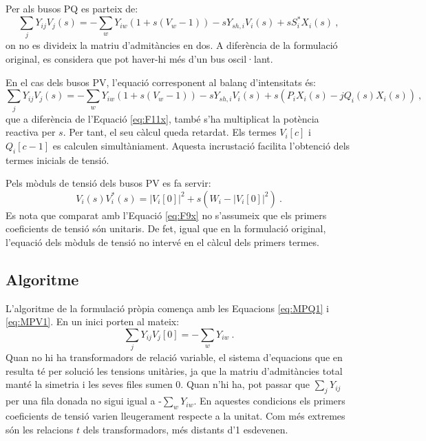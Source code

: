 Per als busos PQ es parteix de:
\begin{equation}
    \sum_{j}Y_{ij}V_j(s) = -\sum_wY_{iw}(1+s(V_w-1)) -sY_{sh,i}V_i(s)+sS^*_iX_i(s)\ ,
        \label{eq:MPQ1}
\end{equation} 
on no es divideix la matriu d'admitàncies en dos. A diferència de la formulació original, es considera que pot haver-hi més d'un bus oscil·lant. 

En el cas dels busos PV, l'equació corresponent al balanç d'intensitats és:
\begin{equation}
    \sum_{j}Y_{ij}V_j(s) = -\sum_wY_{iw}(1+s(V_w-1)) -sY_{sh,i}V_i(s)+s(P_iX_i(s)-jQ_i(s)X_i(s))\ ,
        \label{eq:MPV1}
\end{equation}
que a diferència de l'Equació \ref{eq:F11x}, també s'ha multiplicat la potència reactiva per $s$. Per tant, el seu càlcul queda retardat. Els termes $V_i[c]$ i $Q_i[c-1]$ es calculen simultàniament. Aquesta incrustació facilita l'obtenció dels termes inicials de tensió. 

Pels mòduls de tensió dels busos PV es fa servir:
\begin{equation}
    V_i(s)V^*_i(s)=|V_i[0]|^2+s(W_i-|V_i[0]|^2)\ .
        \label{eq:MPV2}
\end{equation}
Es nota que comparat amb l'Equació \ref{eq:F9x} no s'assumeix que els primers coeficients de tensió són unitaris. De fet, igual que en la formulació original, l'equació dels mòduls de tensió no intervé en el càlcul dels primers termes. 

\subsection{Algoritme}
L'algoritme de la formulació pròpia comença amb les Equacions \ref{eq:MPQ1} i \ref{eq:MPV1}. En un inici porten al mateix:
\begin{equation}
    \sum_jY_{ij}V_j[0]=-\sum_wY_{iw}\ .
        \label{eq:Mordre1}
\end{equation}
Quan no hi ha transformadors de relació variable, el sistema d'equacions que en resulta té per solució les tensions unitàries, ja que la matriu d'admitàncies total manté la simetria i les seves files sumen 0. Quan n'hi ha, pot passar que $\sum_jY_{ij}$ per una fila donada no sigui igual a -$\sum_wY_{iw}$. En aquestes condicions els primers coeficients de tensió varien lleugerament respecte a la unitat. Com més extremes són les relacions $t$ dels transformadors, més distants d'1 esdevenen.

